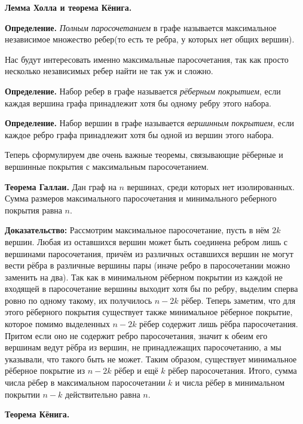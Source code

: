 \centerline{\bf \Huge Лемма Холла и теорема Кёнига.}
\centerline{\bf \Huge }

\textbf{Определение.} \textit{Полным паросочетанием} в графе называется максимальное независимое множество ребер(то есть те ребра, у которых нет общих вершин).

Нас будут интересовать именно максимальные паросочетания, так как просто несколько независимых ребер найти не так уж и сложно. 

\textbf{Определение.} Набор ребер в графе называется \textit{рёберным покрытием}, если каждая вершина графа принадлежит хотя бы одному ребру этого набора.

\textbf{Определение.} Набор вершин в графе называется \textit{вершинным покрытием}, если каждое ребро графа принадлежит хотя бы одной из вершин этого набора.

Теперь сформулируем две очень важные теоремы, связывающие рёберные и вершинные покрытия с максимальным паросочетанием.

 \textbf{Теорема Галлаи.} Дан граф на $n$ вершинах, среди которых нет изолированных. Сумма размеров максимального паросочетания и минимального реберного покрытия равна $n$.

\textbf{Доказательство:}
Рассмотрим максимальное паросочетание, пусть в нём $2k$ вершин. Любая из оставшихся вершин может быть соединена ребром лишь с вершинами паросочетания, причём из различных оставшихся вершин не могут вести рёбра в различные вершины пары (иначе ребро в паросочетании можно заменить на два). Так как в минимальном рёберном покрытии из каждой не входящей в паросочетание вершины выходит хотя бы по ребру, выделим сперва ровно по одному такому, их получилось $n - 2k$ рёбер. Теперь заметим, что для этого рёберного покрытия существует также минимальное рёберное покрытие, которое помимо выделенных $n- 2k$ рёбер содержит лишь рёбра паросочетания. Притом если оно не содержит ребро паросочетания, значит к обеим его вершинам ведут рёбра из вершин, не принадлежащих паросочетанию, а мы указывали, что такого быть не может. Таким образом, существует минимальное рёберное покрытие из $n - 2k$ рёбер и ещё $k$ рёбер паросочетания. Итого, сумма числа рёбер в максимальном паросочетании $k$ и числа рёбер в минимальном покрытии $n - k$ действительно равна $n$.

\newpage

\hspace{3mm}

 \textbf{Теорема Кёнига.}

